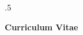 

\moveleft.5\hoffset\centerline{\large{\bf{Curriculum Vitae}}}

\begin{resume}
\vspace{-0.25in}



%
\end{resume}
